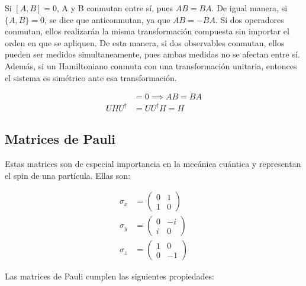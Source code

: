 Si $[A,B] = 0$, A y B conmutan entre sí, pues $AB = BA$. De igual manera, si $\{A,B\} = 0$, se dice que anticonmutan, ya que $AB = -BA$. Si dos operadores conmutan, ellos realizarán la misma transformación compuesta sin importar el orden en que se apliquen. De esta manera, si dos observables conmutan, ellos pueden ser medidos simultaneamente, pues ambas medidas no se afectan entre sí. Además, si un Hamiltoniano conmuta con una transformación unitaria, entonces el sistema es simétrico ante esa transformación.

\begin{align*}
    [A,B] &= 0 \implies A B = B A \\
    U H U^\dagger &= U U^\dagger H = H
\end{align*}


\subsection{Matrices de Pauli}

Estas matrices son de especial importancia en la mecánica cuántica y representan el spin de una partícula. Ellas son:

\begin{align}
    \sigma_x &=
        \begin{pmatrix}
            0 & 1 \\
            1 & 0
        \end{pmatrix} \\
    \sigma_y &=
        \begin{pmatrix}
            0 & -i \\
            i & 0
        \end{pmatrix} \\
    \sigma_z &=
        \begin{pmatrix}
            1 & 0 \\
            0 & -1
        \end{pmatrix}
\end{align}

Las matrices de Pauli cumplen las siguientes propiedades:

